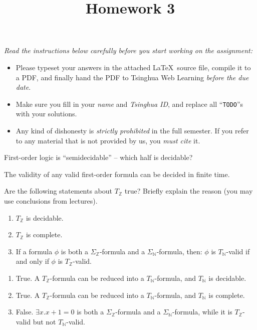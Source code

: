 \documentclass[11pt,a4paper]{article}
\title{Homework 3}
\newcommand{\nat}{\mathbb{N}}
\renewcommand{\int}{\mathbb{Z}}
\begin{document}
\maketitle

\textit{Read the instructions below carefully before you start working on the assignment:}
\begin{itemize}
    \item Please typeset your answers in the attached \LaTeX~source file, compile it to a PDF,
    and finally hand the PDF to Tsinghua Web Learning \emph{before the due date}.
    \item Make sure you fill in your \emph{name} and \emph{Tsinghua ID},
    and replace all ``\texttt{TODO}''s with your solutions.
    \item Any kind of dishonesty is \emph{strictly prohibited} in the full semester.
    If you refer to any material that is not provided by us, you \emph{must cite} it.
\end{itemize}



\subproblem First-order logic is ``semidecidable'' -- which half is decidable?

\begin{solution}
    The validity of any valid first-order formula can be decided in finite time. 
\end{solution}

\subproblem Are the following statements about $T_\int$ true? Briefly explain the reason (you may use conclusions from lectures).

\begin{enumerate}[label=(\alph*)]
    \item $T_\int$ is decidable.
    \item $T_\int$ is complete.
    \item If a formula $\phi$ is both a $\Sigma_\int$-formula and a $\Sigma_\nat$-formula, then: $\phi$ is $T_\nat$-valid if and only if $\phi$ is $T_\int$-valid.
\end{enumerate}

\begin{solution}
    \begin{enumerate}[label=(\alph*)]
      \item True. A $T_\int$-formula can be reduced into a $T_\nat$-formula, and $T_\nat$ is decidable. 
      \item True. A $T_\int$-formula can be reduced into a $T_\nat$-formula, and $T_\nat$ is complete. 
      \item False. $\exists x. x + 1 = 0$ is both a $\Sigma_\int$-formula and a $\Sigma_\nat$-formula, while it is $T_\int$-valid but not $T_\nat$-valid.
    \end{enumerate}
\end{solution}
\end{document}
